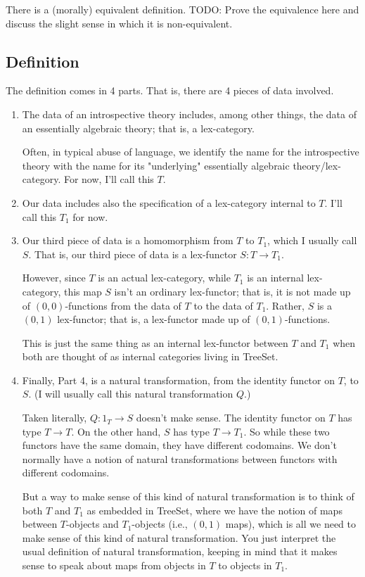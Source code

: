 There is a (morally) equivalent definition. TODO: Prove the equivalence here and discuss the slight sense in which it is non-equivalent.
\subsection{Definition}
The definition comes in 4 parts. That is, there are 4 pieces of data involved.

\begin{enumerate}

\item
The data of an introspective theory includes, among other things, the data of an essentially algebraic theory; that is, a lex-category. 

Often, in typical abuse of language, we identify the name for the introspective theory with the name for its "underlying" essentially algebraic theory/lex-category. For now, I'll call this $T$. 

\item
Our data includes also the specification of a lex-category internal to $T$. I'll call this $T_1$ for now. 

\item
Our third piece of data is a homomorphism from $T$ to $T_1$, which I usually call $S$. That is, our third piece of data is a lex-functor $S : T \to T_1$.

However, since $T$ is an actual lex-category, while $T_1$ is an internal lex-category, this map $S$ isn't an ordinary lex-functor; that is, it is not made up of $(0, 0)$-functions from the data of $T$ to the data of $T_1$. Rather, $S$ is a $(0, 1)$ lex-functor; that is, a lex-functor made up of $(0, 1)$-functions.

This is just the same thing as an internal lex-functor between $T$ and $T_1$ when both are thought of as internal categories living in TreeSet.

\item
Finally, Part 4, is a natural transformation, from the identity functor on $T$, to $S$. (I will usually call this natural transformation $Q$.)

Taken literally, $Q : 1_T \to S$ doesn't make sense. The identity functor on $T$ has type $T \to T$. On the other hand, $S$ has type $T \to T_1$. So while these two functors have the same domain, they have different codomains. We don't normally have a notion of natural transformations between functors with different codomains.

But a way to make sense of this kind of natural transformation is to think of both $T$ and $T_1$ as embedded in TreeSet, where we have the notion of maps between $T$-objects and $T_1$-objects (i.e., $(0, 1)$ maps), which is all we need to make sense of this kind of natural transformation. You just interpret the usual definition of natural transformation, keeping in mind that it makes sense to speak about maps from objects in $T$ to objects in $T_1$.


\end{enumerate}

